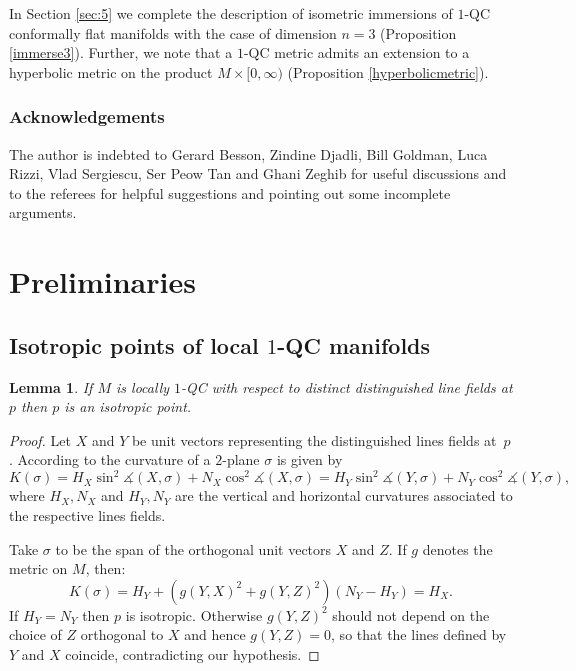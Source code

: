 \documentclass[10pt]{amsart}
\newtheorem{lemma}[theorem]{Lemma}
\theoremstyle{definition}
\theoremstyle{remark}
\numberwithin{equation}{section}
\let\Subsection\subsection\let\Subsubsection\subsubsection
\begin{document}
In Section \ref{sec:5} we complete the description of isometric immersions of $1$-QC conformally flat manifolds with the
case of dimension $n=3$ (Proposition \ref{immerse3}). Further, we note that a $1$-QC metric admits an extension to a
hyperbolic metric on the product $M\times [0,\infty)$ (Proposition \ref{hyperbolicmetric}).

\subsubsection*{Acknowledgements}
The author is indebted to Gerard Besson,
Zindine Djadli, Bill Goldman, Luca Rizzi, Vlad Sergiescu, Ser Peow Tan and Ghani Zeghib for
useful discussions and to the referees for
helpful suggestions and pointing out some incomplete arguments.

\section{Preliminaries}\label{sec:2}

\Subsection{Isotropic points of local $1$-QC manifolds}\label{section-isotropic}

\begin{lemma}\label{isotropy}
If $M$ is locally $1$-QC with respect to distinct distinguished line fields at $p$ then
$p$ is an isotropic point.
\end{lemma}
\begin{proof}
Let $X$ and $Y$ be unit vectors representing the distinguished lines fields at~$p$.
According to \cite{BP} the curvature of a $2$\nobreakdash-plane $\sigma$ is given by
\[ K(\sigma)=H_X \sin^2\measuredangle (X,\sigma) + N_X \cos^2\measuredangle (X,\sigma)=
H_Y \sin^2\measuredangle (Y,\sigma) + N_Y \cos^2\measuredangle (Y,\sigma),\]
where $H_X, N_X$ and $H_Y, N_Y$ are the vertical and horizontal curvatures associated to the respective lines fields.

Take $\sigma$ to be the span of the orthogonal unit vectors $X$ and $Z$. If $g$ denotes the metric on $M$, then:
\[K(\sigma)=H_Y + (g(Y,X)^2+ g(Y, Z)^2)(N_Y-H_Y)=H_X.\]
If $H_Y=N_Y$ then $p$ is isotropic. Otherwise $g(Y, Z)^2$ should not depend on the choice of
$Z$ orthogonal to $X$ and hence $g(Y, Z)=0$, so that the lines defined by $Y$ and $X$ coincide, contradicting our hypothesis.
\end{proof}
\end{document}
